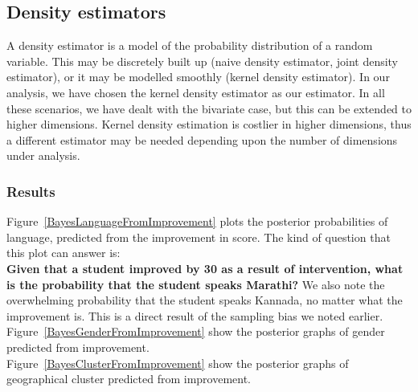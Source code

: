\documentclass[10pt]{article}
\begin{document}
\subsection{Density estimators}
A density estimator is a model of the probability distribution of a random variable. This may be discretely built up (naive density estimator, joint density estimator), or it may be modelled smoothly (kernel density estimator). In our analysis, we have chosen the kernel density estimator as our estimator. In all these scenarios, we have dealt with the bivariate case, but this can be extended to higher dimensions. Kernel density estimation is costlier in higher dimensions, thus a different estimator may be needed depending upon the number of dimensions under analysis.
\subsubsection{Results}
Figure~\ref{BayesLanguageFromImprovement} plots the posterior probabilities of language, predicted from the improvement in score. The kind of question that this plot can answer is:\\
\textbf{Given that a student improved by 30 as a result of intervention, what is the probability that the student speaks Marathi?}
We also note the overwhelming probability that the student speaks Kannada, no matter what the improvement is. This is a direct result of the sampling bias we noted earlier.
Figure~\ref{BayesGenderFromImprovement} show the posterior graphs of gender predicted from improvement.\\
Figure~\ref{BayesClusterFromImprovement} show the posterior graphs of geographical cluster predicted from improvement.\\
\end{document}
